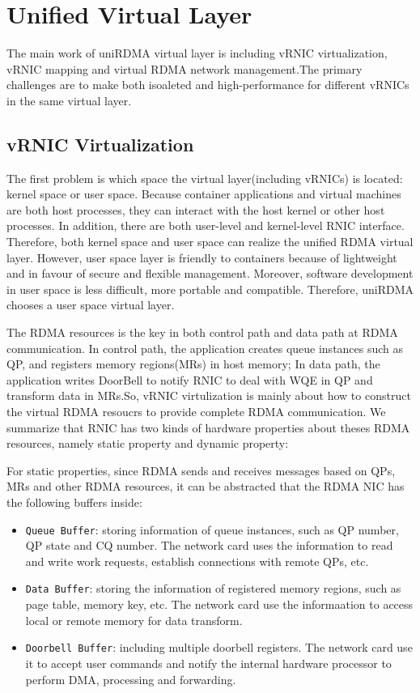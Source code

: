 
\section{Unified Virtual Layer}
 The main work of uniRDMA virtual layer is including vRNIC virtualization, vRNIC mapping  and virtual RDMA network management.The primary challenges are to make both isoaleted and high-performance for different vRNICs in the same virtual layer. 
	
\subsection{vRNIC Virtualization}
The first problem is which space the virtual layer(including vRNICs) is located: kernel space or user space. Because container applications and virtual machines are both host processes, they can interact with the host kernel or other host processes. In addition, there are both user-level and kernel-level RNIC interface. Therefore, both kernel space and user space can realize the unified RDMA virtual layer. However, user space layer is friendly to containers because of lightweight and in favour of secure and flexible management. Moreover, software development in user space is less difficult, more portable and compatible. Therefore, uniRDMA chooses a user space virtual layer.

The RDMA resources is the key in both control path and data path at RDMA communication. In control path, the application creates queue instances such as QP, and registers memory regions(MRs) in host memory; In data path, the application writes DoorBell to notify RNIC to deal with WQE in QP and transform data in MRs.So, vRNIC virtulization is mainly about how to construct the virtual RDMA resoucrs to provide complete RDMA communication. We summarize that RNIC has two kinds of hardware properties about theses RDMA resources, namely static property and dynamic property:

For static properties,  since RDMA sends and receives messages based on QPs, MRs and other RDMA resources, it can be abstracted that the RDMA NIC has the following buffers inside:

\begin{itemize}
\item {\verb|Queue Buffer|}: storing information of queue instances, such as QP number, QP state and CQ number. The network card uses the information to read and write work requests, establish connections with remote QPs, etc.  
\item {\verb|Data Buffer|}: storing the information of registered memory regions, such as page table, memory key, etc. The network card use the informaation to access local or remote memory for data transform.  
\item {\verb|Doorbell Buffer|}: including multiple doorbell registers. The network card use it to accept user commands and notify the internal hardware processor to perform DMA, processing and forwarding. 
\end{itemize}

